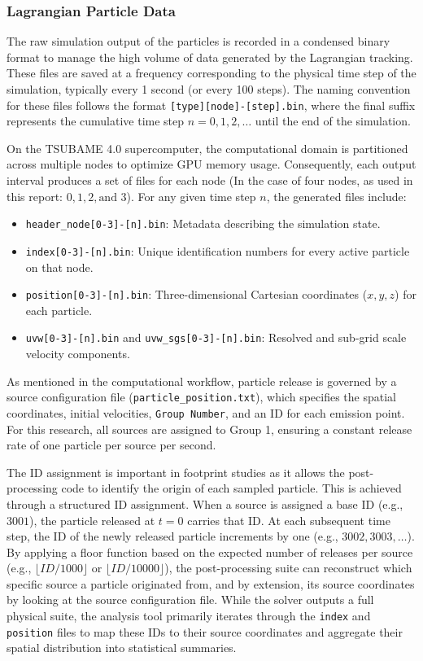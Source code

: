 \subsubsection{Lagrangian Particle Data}

The raw simulation output of the particles is recorded in a condensed binary format to manage the high volume of data generated by the Lagrangian tracking. These files are saved at a frequency corresponding to the physical time step of the simulation, typically every 1 second (or every 100 steps). The naming convention for these files follows the format \texttt{[type][node]-[step].bin}, where the final suffix represents the cumulative time step $n = 0, 1, 2, \dots$ until the end of the simulation.

On the TSUBAME 4.0 supercomputer, the computational domain is partitioned across multiple nodes to optimize GPU memory usage. Consequently, each output interval produces a set of files for each node (In the case of four nodes, as used in this report: $0, 1, 2, \text{and } 3$). For any given time step $n$, the generated files include:

\begin{itemize}
    \item \texttt{header\_node[0-3]-[n].bin}: Metadata describing the simulation state.
    \item \texttt{index[0-3]-[n].bin}: Unique identification numbers for every active particle on that node.
    \item \texttt{position[0-3]-[n].bin}: Three-dimensional Cartesian coordinates ($x, y, z$) for each particle.
    \item \texttt{uvw[0-3]-[n].bin} and \texttt{uvw\_sgs[0-3]-[n].bin}: Resolved and sub-grid scale velocity components.
\end{itemize}

As mentioned in the computational workflow, particle release is governed by a source configuration file (\texttt{particle\_position.txt}), which specifies the spatial coordinates, initial velocities, \texttt{Group Number}, and an ID for each emission point. For this research, all sources are assigned to Group 1, ensuring a constant release rate of one particle per source per second.

The ID assignment is important in footprint studies as it allows the post-processing code to identify the origin of each sampled particle. This is achieved through a structured ID assignment. When a source is assigned a base ID (e.g., $3001$), the particle released at $t=0$ carries that ID. At each subsequent time step, the ID of the newly released particle increments by one (e.g., $3002, 3003, \dots$). By applying a floor function based on the expected number of releases per source (e.g., $\lfloor ID / 1000 \rfloor$ or $\lfloor ID / 10000 \rfloor$), the post-processing suite can reconstruct which specific source a particle originated from, and by extension, its source coordinates by looking at the source configuration file. While the solver outputs a full physical suite, the analysis tool primarily iterates through the \texttt{index} and \texttt{position} files to map these IDs to their source coordinates and aggregate their spatial distribution into statistical summaries.

